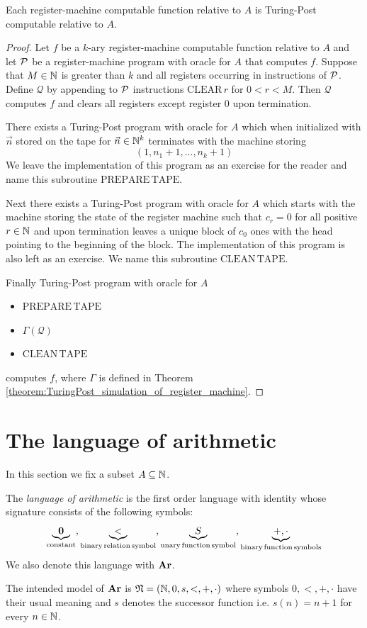 \documentclass[10pt]{amsart}
\begin{document}
\begin{corollary}\label{corollary:register_machine_are_Turing_Post_computable}
	Each register-machine computable function relative to $A$ is Turing-Post computable relative to $A$.
\end{corollary}
\begin{proof}
	Let $f$ be a $k$-ary register-machine computable function relative to $A$ and let ${\mathcal P}$ be a register-machine program with oracle for $A$ that computes $f$. Suppose that $M \in {\mathbb N}$ is greater than $k$ and all registers occurring in instructions of ${\mathcal P}$. Define $\mathcal{Q}$ by appending to ${\mathcal P}$ instructions $\mathrm{CLEAR\,}r$ for $0 < r < M$. Then $\mathcal{Q}$ computes $f$ and clears all registers except register $0$ upon termination.

	There exists a Turing-Post program with oracle for $A$ which when initialized with $\vec{n}$ stored on the tape for $\vec{n} \in {\mathbb N}^k$ terminates with the machine storing
	$$\left(1,n_1+1,...,n_k+1\right)$$
	We leave the implementation of this program as an exercise for the reader and name this subroutine $\mathrm{PREPARE\,TAPE}$.

	Next there exists a Turing-Post program with oracle for $A$ which starts with the machine storing the state of the register machine such that $c_r = 0$ for all positive $r \in {\mathbb N}$ and upon termination leaves a unique block of $c_0$ ones with the head pointing to the beginning of the block. The implementation of this program is also left as an exercise. We name this subroutine $\mathrm{CLEAN\,TAPE}$.

	Finally Turing-Post program with oracle for $A$
	\begin{itemize}
		\item[] $\mathrm{PREPARE\,TAPE}$
		\item[] $\Gamma(\mathcal{Q})$
		\item[] $\mathrm{CLEAN\,TAPE}$
	\end{itemize}
	computes $f$, where $\Gamma$ is defined in Theorem \ref{theorem:TuringPost_simulation_of_register_machine}.
\end{proof}

\section{The language of arithmetic}
\noindent
In this section we fix a subset $A \subseteq {\mathbb N}$.

\begin{definition}
	The \textit{language of arithmetic} is the first order language with identity whose signature consists of the following symbols:
	$$\underbrace{\mathbf{0}}_{\mathrm{constant}},\underbrace{<}_{\mathrm{binary\,relation\,symbol}},\underbrace{S}_{\mathrm{unary\,function\,symbol}},\underbrace{+,\cdot}_{\mathrm{binary\,function\,symbols}}$$
	We also denote this language with $\mathbf{Ar}$.
\end{definition}
\noindent
The intended model of $\mathbf{Ar}$ is ${\mathfrak N} = \left({\mathbb N},0,s,<,+,\cdot\right)$ where symbols $0,<,+,\cdot$ have their usual meaning and $s$ denotes the successor function i.e. $s(n) = n + 1$ for every $n \in {\mathbb N}$.
\end{document}

